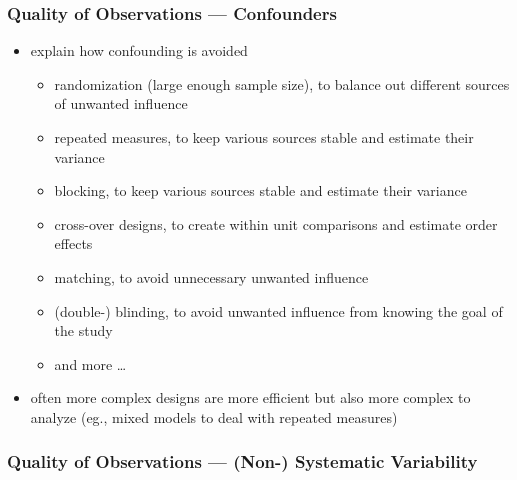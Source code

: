 \documentclass[]{article}
\providecommand{\tightlist}{%
  \setlength{\itemsep}{0pt}\setlength{\parskip}{0pt}}
\begin{document}
\subsubsection{Quality of Observations ---
Confounders}\label{quality-of-observations-confounders}

\begin{itemize}
\tightlist
\item
  explain how confounding is avoided

  \begin{itemize}
  \tightlist
  \item
    randomization (large enough sample size), to balance out different
    sources of unwanted influence
  \item
    repeated measures, to keep various sources stable and estimate their
    variance
  \item
    blocking, to keep various sources stable and estimate their variance
  \item
    cross-over designs, to create within unit comparisons and estimate
    order effects
  \item
    matching, to avoid unnecessary unwanted influence
  \item
    (double-) blinding, to avoid unwanted influence from knowing the
    goal of the study
  \item
    and more \ldots{} 
  \end{itemize}
\item
  often more complex designs are more efficient but also more complex to
  analyze (eg., mixed models to deal with repeated measures)
\end{itemize}

\subsubsection{Quality of Observations --- (Non-) Systematic
Variability}\label{quality-of-observations-non--systematic-variability}
\end{document}
